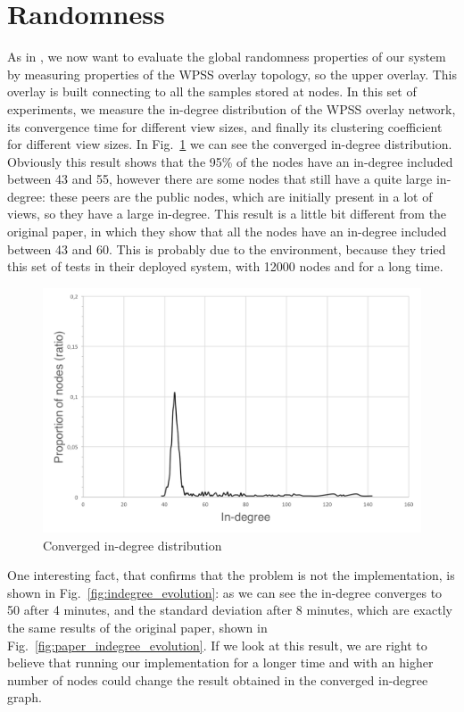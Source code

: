 \section{Randomness}
\label{sec:eval_randomness}
As in \cite{wormhole}, we now want to evaluate the global randomness properties of our system by measuring properties of the WPSS overlay topology, so the upper overlay. This overlay is built connecting to all the samples stored at nodes. In this set of experiments, we measure the in-degree distribution of the WPSS overlay network, its convergence time for different view sizes, and finally its clustering coefficient for different view sizes. In Fig.~\ref{fig:converged_indegree} we can see the converged in-degree distribution. Obviously this result shows that the 95\% of the nodes have an in-degree included between 43 and 55, however there are some nodes that still have a quite large in-degree: these peers are the public nodes, which are initially present in a lot of views, so they have a large in-degree. This result is a little bit different from the original paper, in which they show that all the nodes have an in-degree included between 43 and 60. This is probably due to the environment, because they tried this set of tests in their deployed system, with 12000 nodes and for a long time. 
\begin{figure}[ht]
  \centering
  \includegraphics[keepaspectratio=true, width=\textwidth]{images/converged_indegree}\caption{Converged in-degree distribution}
  \label{fig:converged_indegree}
\end{figure}

One interesting fact, that confirms that the problem is not the implementation, is shown in Fig.~\ref{fig:indegree_evolution}: as we can see the in-degree converges to 50 after 4 minutes, and the standard deviation after 8 minutes, which are exactly the same results of the original paper, shown in Fig.~\ref{fig:paper_indegree_evolution}. If we look at this result, we are right to believe that running our implementation for a longer time and with an higher number of nodes could change the result obtained in the converged in-degree graph.

